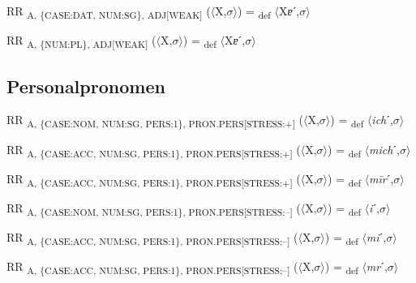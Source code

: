 {\begin{exe}
 RR \textsubscript{A, \{CASE:DAT, NUM:SG\}, ADJ[WEAK]} ($\langle$X,$\sigma $$\rangle$) = \textsubscript{def} $\langle$X\textit{ɐ}ˊ,$\sigma $$\rangle$
\end{exe}

\begin{exe}
 RR \textsubscript{A, \{NUM:PL\}, ADJ[WEAK]} ($\langle$X,$\sigma $$\rangle$) = \textsubscript{def} $\langle$X\textit{ɐ}ˊ,$\sigma $$\rangle$
\end{exe}

\subsection{Personalpronomen}

\begin{exe}
 RR \textsubscript{A, \{CASE:NOM, NUM:SG, PERS:1\}, PRON.PERS[STRESS:+]} ($\langle$X,$\sigma $$\rangle$) = \textsubscript{def} $\langle$\textit{ich}ˊ,$\sigma $$\rangle$
\end{exe}

\begin{exe}
 RR \textsubscript{A, \{CASE:ACC, NUM:SG, PERS:1\}, PRON.PERS[STRESS:+]} ($\langle$X,$\sigma $$\rangle$) = \textsubscript{def} $\langle$\textit{mich}ˊ,$\sigma $$\rangle$
\end{exe}

\begin{exe}
 RR \textsubscript{A, \{CASE:ACC, NUM:SG, PERS:1\}, PRON.PERS[STRESS:+]} ($\langle$X,$\sigma $$\rangle$) = \textsubscript{def} $\langle$\textit{m\=ir}ˊ,$\sigma $$\rangle$
\end{exe}

\begin{exe}
 RR \textsubscript{A, \{CASE:NOM, NUM:SG, PERS:1\}, PRON.PERS[STRESS:–]} ($\langle$X,$\sigma $$\rangle$) = \textsubscript{def} $\langle$\textit{i}ˊ,$\sigma $$\rangle$
\end{exe}

\begin{exe}
 RR \textsubscript{A, \{CASE:ACC, NUM:SG, PERS:1\}, PRON.PERS[STRESS:–]} ($\langle$X,$\sigma $$\rangle$) = \textsubscript{def} $\langle$\textit{mi}ˊ,$\sigma $$\rangle$
\end{exe}

\begin{exe}
 RR \textsubscript{A, \{CASE:ACC, NUM:SG, PERS:1\}, PRON.PERS[STRESS:–]} ($\langle$X,$\sigma $$\rangle$) = \textsubscript{def} $\langle$\textit{mr}ˊ,$\sigma $$\rangle$
\end{exe}

}
